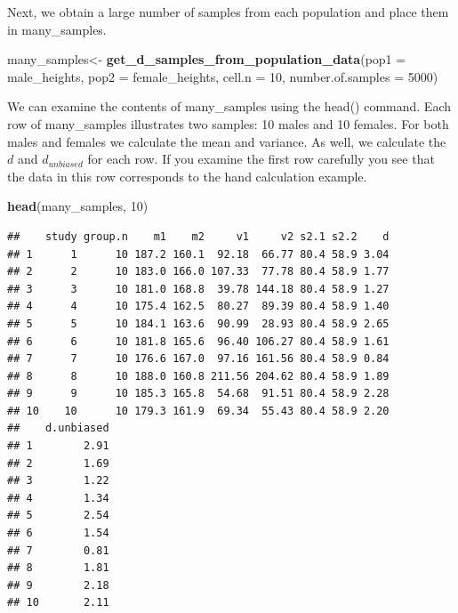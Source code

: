 \documentclass[
]{krantz}
\makeatletter
\newenvironment{Shaded}{\begin{snugshade}}{\end{snugshade}}
\newcommand{\DataTypeTok}[1]{\textcolor[rgb]{0.27,0.27,0.27}{#1}}
\newcommand{\DecValTok}[1]{\textcolor[rgb]{0.06,0.06,0.06}{#1}}
\newcommand{\KeywordTok}[1]{\textcolor[rgb]{0.27,0.27,0.27}{\textbf{#1}}}
\newcommand{\NormalTok}[1]{#1}
\newcommand{\OperatorTok}[1]{\textcolor[rgb]{0.43,0.43,0.43}{\textbf{#1}}}
\newcommand{\StringTok}[1]{\textcolor[rgb]{0.5,0.5,0.5}{#1}}
\newenvironment{kframe}{%
\medskip{}
\setlength{\fboxsep}{.8em}
 \def\at@end@of@kframe{}%
 \ifinner\ifhmode%
  \def\at@end@of@kframe{\end{minipage}}%
  \begin{minipage}{\columnwidth}%
 \fi\fi%
 \def\FrameCommand##1{\hskip\@totalleftmargin \hskip-\fboxsep
 \colorbox{shadecolor}{##1}\hskip-\fboxsep
     \hskip-\linewidth \hskip-\@totalleftmargin \hskip\columnwidth}%
 \MakeFramed {\advance\hsize-\width
   \@totalleftmargin\z@ \linewidth\hsize
   \@setminipage}}%
 {\par\unskip\endMakeFramed%
 \at@end@of@kframe}
\renewenvironment{Shaded}{\begin{kframe}}{\end{kframe}}
\makeatother
\begin{document}
\begin{Shaded}
\end{Shaded}

Next, we obtain a large number of samples from each population and place them in many\_samples.

\begin{Shaded}
\begin{Highlighting}[]
\NormalTok{many_samples<-}\StringTok{  }\KeywordTok{get_d_samples_from_population_data}\NormalTok{(}\DataTypeTok{pop1 =}\NormalTok{ male_heights,}
                                   \DataTypeTok{pop2 =}\NormalTok{ female_heights,}
                                   \DataTypeTok{cell.n =} \DecValTok{10}\NormalTok{,}
                                   \DataTypeTok{number.of.samples =} \DecValTok{5000}\NormalTok{)}
\end{Highlighting}
\end{Shaded}

We can examine the contents of many\_samples using the head() command. Each row of many\_samples illustrates two samples: 10 males and 10 females. For both males and females we calculate the mean and variance. As well, we calculate the \(d\) and \(d_{unbiased}\) for each row. If you examine the first row carefully you see that the data in this row corresponds to the hand calculation example.

\begin{Shaded}
\begin{Highlighting}[]
\KeywordTok{head}\NormalTok{(many_samples, }\DecValTok{10}\NormalTok{)}
\end{Highlighting}
\end{Shaded}

\begin{verbatim}
##    study group.n    m1    m2     v1     v2 s2.1 s2.2    d
## 1      1      10 187.2 160.1  92.18  66.77 80.4 58.9 3.04
## 2      2      10 183.0 166.0 107.33  77.78 80.4 58.9 1.77
## 3      3      10 181.0 168.8  39.78 144.18 80.4 58.9 1.27
## 4      4      10 175.4 162.5  80.27  89.39 80.4 58.9 1.40
## 5      5      10 184.1 163.6  90.99  28.93 80.4 58.9 2.65
## 6      6      10 181.8 165.6  96.40 106.27 80.4 58.9 1.61
## 7      7      10 176.6 167.0  97.16 161.56 80.4 58.9 0.84
## 8      8      10 188.0 160.8 211.56 204.62 80.4 58.9 1.89
## 9      9      10 185.3 165.8  54.68  91.51 80.4 58.9 2.28
## 10    10      10 179.3 161.9  69.34  55.43 80.4 58.9 2.20
##    d.unbiased
## 1        2.91
## 2        1.69
## 3        1.22
## 4        1.34
## 5        2.54
## 6        1.54
## 7        0.81
## 8        1.81
## 9        2.18
## 10       2.11
\end{verbatim}
\end{document}
